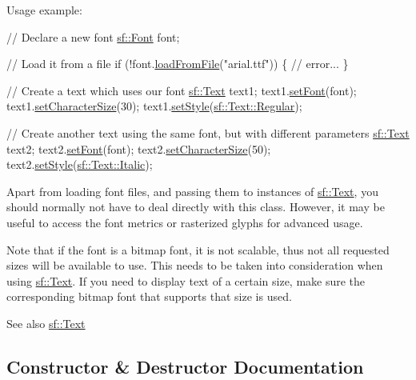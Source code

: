 Usage example\+: 
\begin{DoxyCode}
\textcolor{comment}{// Declare a new font}
\hyperlink{classsf_1_1_font}{sf::Font} font;

\textcolor{comment}{// Load it from a file}
\textcolor{keywordflow}{if} (!font.\hyperlink{classsf_1_1_font_ab020052ef4e01f6c749a85571c0f3fd1}{loadFromFile}(\textcolor{stringliteral}{"arial.ttf"}))
\{
    \textcolor{comment}{// error...}
\}

\textcolor{comment}{// Create a text which uses our font}
\hyperlink{classsf_1_1_text}{sf::Text} text1;
text1.\hyperlink{classsf_1_1_text_a2927805d1ae92d57f15034ea34756b81}{setFont}(font);
text1.\hyperlink{classsf_1_1_text_ae96f835fc1bff858f8a23c5b01eaaf7e}{setCharacterSize}(30);
text1.\hyperlink{classsf_1_1_text_ad791702bc2d1b6590a1719aa60635edf}{setStyle}(\hyperlink{classsf_1_1_text_aa8add4aef484c6e6b20faff07452bd82a2af9ae5e1cda126570f744448e0caa32}{sf::Text::Regular});

\textcolor{comment}{// Create another text using the same font, but with different parameters}
\hyperlink{classsf_1_1_text}{sf::Text} text2;
text2.\hyperlink{classsf_1_1_text_a2927805d1ae92d57f15034ea34756b81}{setFont}(font);
text2.\hyperlink{classsf_1_1_text_ae96f835fc1bff858f8a23c5b01eaaf7e}{setCharacterSize}(50);
text2.\hyperlink{classsf_1_1_text_ad791702bc2d1b6590a1719aa60635edf}{setStyle}(\hyperlink{classsf_1_1_text_aa8add4aef484c6e6b20faff07452bd82aee249eb803848723c542c2062ebe69d8}{sf::Text::Italic});
\end{DoxyCode}


Apart from loading font files, and passing them to instances of \hyperlink{classsf_1_1_text}{sf\+::\+Text}, you should normally not have to deal directly with this class. However, it may be useful to access the font metrics or rasterized glyphs for advanced usage.

Note that if the font is a bitmap font, it is not scalable, thus not all requested sizes will be available to use. This needs to be taken into consideration when using \hyperlink{classsf_1_1_text}{sf\+::\+Text}. If you need to display text of a certain size, make sure the corresponding bitmap font that supports that size is used.

\begin{DoxySeeAlso}{See also}
\hyperlink{classsf_1_1_text}{sf\+::\+Text} 
\end{DoxySeeAlso}


\subsection{Constructor \& Destructor Documentation}
\mbox{\label{classsf_1_1_font_a506404655b8869ed60d1e7709812f583}} 

